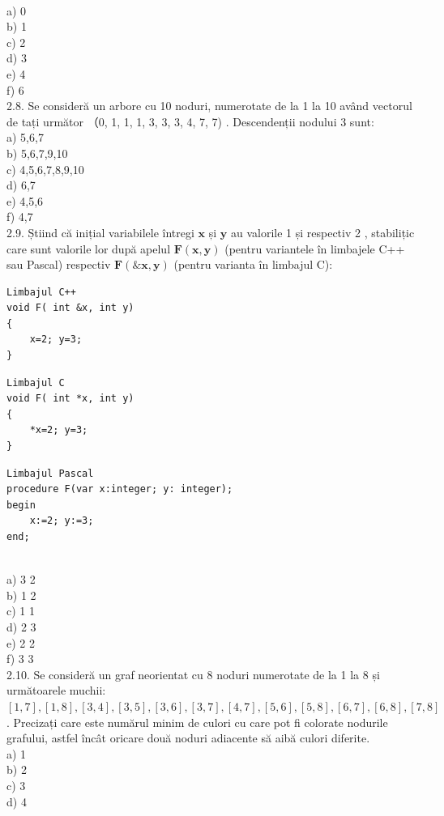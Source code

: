 \\
a) 0
\\
b) 1
\\
c) 2
\\
d) 3
\\
e) 4
\\
f) 6
\\
2.8. Se consideră un arbore cu 10 noduri, numerotate de la 1 la 10 având vectorul de tați următor （0, 1, 1, 1, 3, 3, 3, 4, 7, 7) . Descendenții nodului 3 sunt:
\\
a) 5,6,7
\\
b) 5,6,7,9,10
\\
c) 4,5,6,7,8,9,10
\\
d) 6,7
\\
e) 4,5,6
\\
f) 4,7
\\
2.9. Știind că inițial variabilele întregi $\mathbf{x}$ și $\mathbf{y}$ au valorile 1 și respectiv 2 , stabilițic care sunt valorile lor după apelul $\mathbf{F}(\mathbf{x}, \mathbf{y})$ (pentru variantele în limbajele C++ sau Pascal) respectiv $\mathbf{F}(\& \mathbf{x}, \mathbf{y})$ (pentru varianta în limbajul C):
\begin{verbatim}
Limbajul C++
void F( int &x, int y)
{
    x=2; y=3;
}
\end{verbatim}
\begin{verbatim}
Limbajul C
void F( int *x, int y)
{
    *x=2; y=3;
}
\end{verbatim}
\begin{verbatim}
Limbajul Pascal
procedure F(var x:integer; y: integer);
begin
    x:=2; y:=3;
end;
\end{verbatim}
\\
a) 3 2
\\
b) 1 2
\\
c) 1 1
\\
d) 2 3
\\
e) 2 2
\\
f) 3 3
\\
2.10. Se consideră un graf neorientat cu 8 noduri numerotate de la 1 la 8 și următoarele muchii: $[1,7],[1,8],[3,4],[3,5],[3,6],[3,7],[4,7],[5,6],[5,8],[6,7],[6,8],[7,8]$. Precizați care este numărul minim de culori cu care pot fi colorate nodurile grafului, astfel încât oricare două noduri adiacente să aibă culori diferite.
\\
a) 1
\\
b) 2
\\
c) 3
\\
d) 4
\\
